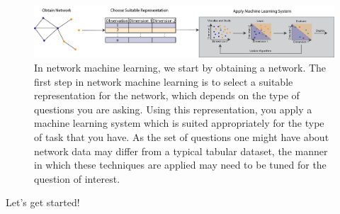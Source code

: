 \begin{figure}
    \centering
    \includegraphics[width=\linewidth]{foundations/ch1/Images/nml-high-level.png}
    \caption[Network machine learning]{In network machine learning, we start by obtaining a network. The first step in network machine learning is to select a suitable representation for the network, which depends on the type of questions you are asking. Using this representation, you apply a machine learning system which is suited appropriately for the type of task that you have. As the set of questions one might have about network data may differ from a typical tabular dataset, the manner in which these techniques are applied may need to be tuned for the question of interest.}
    \label{fig:ch1:nml-high-level}
\end{figure}



Let's get started!

\newpage